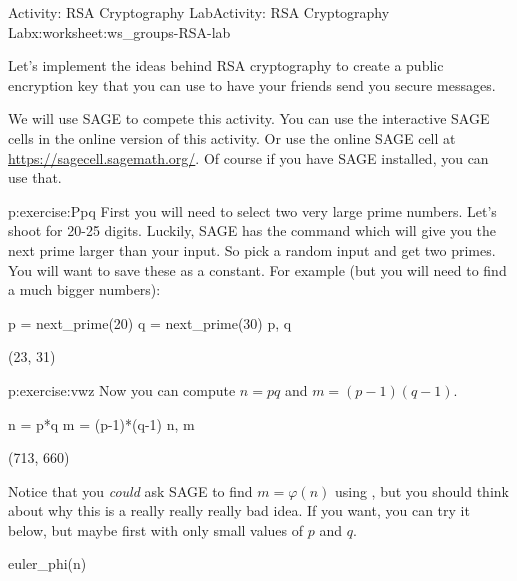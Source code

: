 \documentclass[11pt]{book}
\begin{document}
%
%
\typeout{************************************************}
\typeout{************************************************}
%
\begin{worksheet-section}{Activity: RSA Cryptography Lab}{}{Activity: RSA Cryptography Lab}{}{}{x:worksheet:ws_groups-RSA-lab}
\begin{introduction}{}%
Let's implement the ideas behind RSA cryptography to create a public encryption key that you can use to have your friends send you secure messages.%
\par
We will use SAGE to compete this activity.  You can use the interactive SAGE cells in the online version of this activity.  Or use the online SAGE cell at \href{}{https:\slash{}\slash{}sagecell.sagemath.org\slash{}}.  Of course if you have SAGE installed, you can use that.%
\end{introduction}%
\begin{divisionexercise}{1}{}{}{p:exercise:Ppq}%
First you will need to select two very large prime numbers.  Let's shoot for 20-25 digits. Luckily, SAGE has the command which will give you the next prime larger than your input.  So pick a random input and get two primes.  You will want to save these as a constant.  For example (but you will need to find a much bigger numbers):%
\begin{sageinput}
p = next_prime(20)
q = next_prime(30)
p, q
\end{sageinput}
\begin{sageoutput}
(23, 31)
\end{sageoutput}
\end{divisionexercise}%
\begin{divisionexercise}{2}{}{}{p:exercise:vwz}%
Now you can compute \(n = pq\) and \(m = (p-1)(q-1)\).%
\begin{sageinput}
n = p*q
m = (p-1)*(q-1)
n, m
\end{sageinput}
\begin{sageoutput}
(713, 660)
\end{sageoutput}
Notice that you \emph{could} ask SAGE to find \(m = \varphi(n)\) using , but you should think about why this is a really really really bad idea.  If you want, you can try it below, but maybe first with only small values of \(p\) and \(q\).%
\begin{sageinput}
euler_phi(n)
\end{sageinput}
\begin{sageoutput}

\end{sageoutput}
\end{divisionexercise}
\end{worksheet-section}
\end{document}

